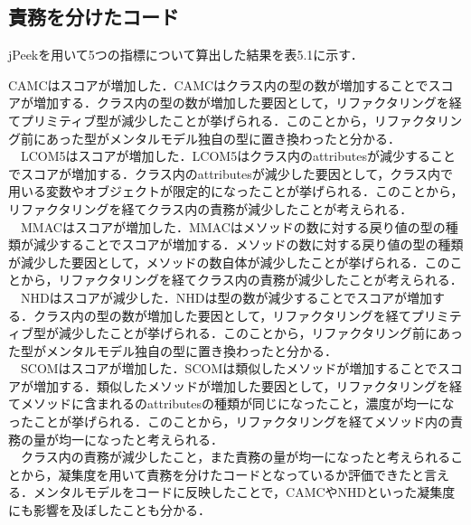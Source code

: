 \documentclass[12pt, a4paper]{jreport}
\begin{document}
\subsection{責務を分けたコード}
jPeekを用いて5つの指標について算出した結果を表5.1に示す．
\begin{table}[H]
\centering
\caption{jPeekによる算出結果}
\label{ttt}
\end{table}
CAMCはスコアが増加した．CAMCはクラス内の型の数が増加することでスコアが増加する．クラス内の型の数が増加した要因として，リファクタリングを経てプリミティブ型が減少したことが挙げられる．このことから，リファクタリング前にあった型がメンタルモデル独自の型に置き換わったと分かる．
\\　LCOM5はスコアが増加した．LCOM5はクラス内のattributesが減少することでスコアが増加する．クラス内のattributesが減少した要因として，クラス内で用いる変数やオブジェクトが限定的になったことが挙げられる．このことから，リファクタリングを経てクラス内の責務が減少したことが考えられる．
\\　MMACはスコアが増加した．MMACはメソッドの数に対する戻り値の型の種類が減少することでスコアが増加する．メソッドの数に対する戻り値の型の種類が減少した要因として，メソッドの数自体が減少したことが挙げられる．このことから，リファクタリングを経てクラス内の責務が減少したことが考えられる．
\\　NHDはスコアが減少した．NHDは型の数が減少することでスコアが増加する．クラス内の型の数が増加した要因として，リファクタリングを経てプリミティブ型が減少したことが挙げられる．このことから，リファクタリング前にあった型がメンタルモデル独自の型に置き換わったと分かる．
\\　SCOMはスコアが増加した．SCOMは類似したメソッドが増加することでスコアが増加する．類似したメソッドが増加した要因として，リファクタリングを経てメソッドに含まれるのattributesの種類が同じになったこと，濃度が均一になったことが挙げられる．このことから，リファクタリングを経てメソッド内の責務の量が均一になったと考えられる．
\\　クラス内の責務が減少したこと，また責務の量が均一になったと考えられることから，凝集度を用いて責務を分けたコードとなっているか評価できたと言える．メンタルモデルをコードに反映したことで，CAMCやNHDといった凝集度にも影響を及ぼしたことも分かる．
\end{document}
